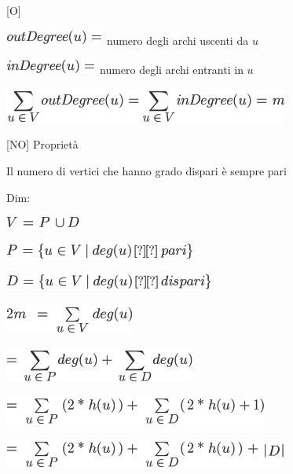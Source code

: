 \documentclass{article}
\begin{document}
{{{[}O{]}}

\includegraphics{images/image363.png}{~numero degli archi
uscenti da }$u$

\includegraphics{images/image364.png}{~numero degli archi entranti in
}$u$



\includegraphics{images/image365.png}

{}

{{[}NO{]} Proprietà}

{Il numero di vertici che hanno grado dispari è sempre pari}

{Dim: }

\includegraphics{images/image366.png}

\includegraphics{images/image367.png}

\includegraphics{images/image368.png}

{}

\includegraphics{images/image369.png}

\includegraphics{images/image370.png}{~}

\includegraphics{images/image371.png}{~}

\includegraphics{images/image372.png}{~}

}
\end{document}
